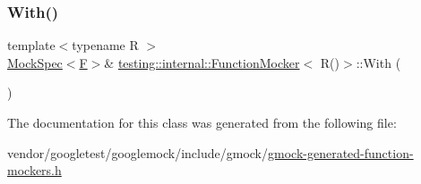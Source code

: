 \mbox{\label{classtesting_1_1internal_1_1_function_mocker_3_01_r_07_08_4_af5151d1ae246fab13ac6e890fa2599be}} 
\subsubsection{\texorpdfstring{With()}{With()}}
{\footnotesize\ttfamily template$<$typename R $>$ \\
\hyperlink{classtesting_1_1internal_1_1_mock_spec}{Mock\+Spec}$<$\hyperlink{classtesting_1_1internal_1_1_function_mocker_3_01_r_07_08_4_a2c1d7da413176d87405227df90a95521}{F}$>$\& \hyperlink{classtesting_1_1internal_1_1_function_mocker}{testing\+::internal\+::\+Function\+Mocker}$<$ R()$>$\+::With (\begin{DoxyParamCaption}{ }\end{DoxyParamCaption})\hspace{0.3cm}{\ttfamily [inline]}}



The documentation for this class was generated from the following file\+:\begin{DoxyCompactItemize}
\item 
vendor/googletest/googlemock/include/gmock/\hyperlink{gmock-generated-function-mockers_8h}{gmock-\/generated-\/function-\/mockers.\+h}\end{DoxyCompactItemize}
